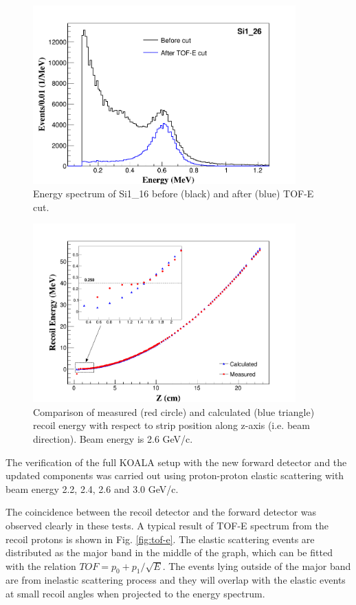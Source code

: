 \documentclass[number]{elsarticle}
\begin{document}
\begin{figure}[htbp]
\centering
\includegraphics[width=0.9\textwidth]{./comparison_tof_e_cut.png}
\caption{Energy spectrum of Si1\_16 before (black) and after (blue) TOF-E cut.}
\label{fig:cut}
\end{figure}

\begin{figure}[htbp]
\centering
\includegraphics[width=0.9\textwidth]{./calc_vs_measured_combined.png}
\caption{
Comparison of measured (red circle) and calculated (blue triangle) recoil energy with respect to strip position along z-axis (i.e. beam direction). Beam energy is 2.6 GeV/c.}
\label{fig:measured_vs_calculated}
\end{figure}

The verification of the full KOALA setup with the new forward detector and the updated components was carried out using proton-proton elastic scattering with beam energy
2.2, 2.4, 2.6 and 3.0 GeV/c.

The coincidence between the recoil detector and the forward detector was observed clearly in these tests.
A typical result of TOF-E spectrum from the recoil protons is shown in Fig. \ref{fig:tof-e}. 
The elastic scattering events are distributed as the major band in the middle of the graph, which can be fitted with the relation \(TOF = p_{0} + p_{1}/{\sqrt{E}}\).
The events lying outside of the major band are from inelastic scattering process and they will overlap with the elastic events at small recoil angles when projected to the energy spectrum.
\end{document}
